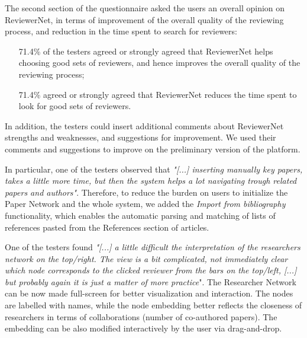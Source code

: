 The second section of the questionnaire asked the users an overall opinion on ReviewerNet, in terms of improvement of the overall quality of the reviewing process, and reduction in the time spent to search for reviewers:  %
%
\begin{itemize}
\item [71.4\%] of the testers agreed or strongly agreed that ReviewerNet helps choosing good sets of reviewers, and hence improves the overall quality of the reviewing process;
\item [71.4\%] agreed or strongly agreed that ReviewerNet reduces the time spent to look for good sets of reviewers. 
\end{itemize}

In addition, the testers could insert additional comments about ReviewerNet strengths and weaknesses, and suggestions for improvement. We used their comments and suggestions to improve on the preliminary version of the platform.

In particular, one of the testers observed that {\em "[...] inserting manually key papers, takes a little more time, but then the system helps a lot navigating trough related papers and authors"}. Therefore, to reduce the burden on users to initialize the Paper Network and the whole system, we added the \emph{Import from bibliography} functionality, which enables the automatic parsing and matching of lists of references pasted from the References section of articles.

One of the testers found  {\em "[...] a little difficult the interpretation of the researchers network on the top/right. The view is a bit complicated, not immediately clear which node corresponds to the clicked reviewer from the bars on the top/left,
[...] but probably again it is just a matter of more practice}". The Researcher Network can be now made full-screen for better visualization and interaction. The nodes are labelled with names, while the node embedding better reflects the closeness of researchers in terms of collaborations (number of co-authored papers). The embedding can be also modified interactively by the user via drag-and-drop.

